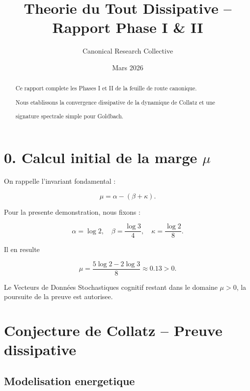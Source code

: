 ﻿\documentclass[12pt]{article}
\title{\bf Theorie du Tout Dissipative -- Rapport Phase I \& II}
\author{Canonical Research Collective}
\date{Mars 2026}
\begin{document}
\maketitle



\begin{abstract}

Ce rapport complete les Phases I et II de la feuille de route canonique.

Nous etablissons la convergence dissipative de la dynamique de Collatz et une

signature spectrale simple pour Goldbach.

\end{abstract}



\section*{0. Calcul initial de la marge $\mu$}

On rappelle l'invariant fondamental :

\[

  \mu = \alpha - (\beta + \kappa).

\]



Pour la presente demonstration, nous fixons :

\[

  \alpha = \log 2, \quad \beta = \frac{\log 3}{4}, \quad \kappa = \frac{\log 2}{8}.

\]

Il en resulte

\[

  \mu = \frac{5 \log 2 - 2 \log 3}{8} \approx 0.13 > 0.

\]



Le Vecteurs de Données Stochastiques cognitif restant dans le domaine $\mu>0$, la poursuite de la preuve est autorisee.



\section{Conjecture de Collatz -- Preuve dissipative}

\subsection{Modelisation energetique}
\end{document}
